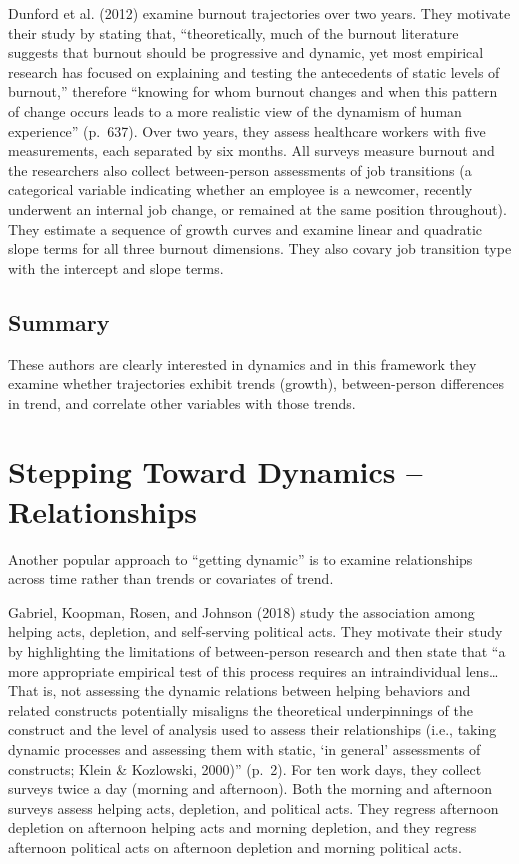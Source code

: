 \documentclass[english,,man]{apa6}
\theoremstyle{definition}
\theoremstyle{definition}
\theoremstyle{definition}
\theoremstyle{remark}
\begin{document}
Dunford et al. (2012) examine burnout trajectories over two years. They
motivate their study by stating that, \enquote{theoretically, much of
the burnout literature suggests that burnout should be progressive and
dynamic, yet most empirical research has focused on explaining and
testing the antecedents of static levels of burnout,} therefore
\enquote{knowing for whom burnout changes and when this pattern of
change occurs leads to a more realistic view of the dynamism of human
experience} (p.~637). Over two years, they assess healthcare workers
with five measurements, each separated by six months. All surveys
measure burnout and the researchers also collect between-person
assessments of job transitions (a categorical variable indicating
whether an employee is a newcomer, recently underwent an internal job
change, or remained at the same position throughout). They estimate a
sequence of growth curves and examine linear and quadratic slope terms
for all three burnout dimensions. They also covary job transition type
with the intercept and slope terms.

\hypertarget{summary}{%
\subsection{Summary}\label{summary}}

These authors are clearly interested in dynamics and in this framework
they examine whether trajectories exhibit trends (growth),
between-person differences in trend, and correlate other variables with
those trends.

\hypertarget{stepping-toward-dynamics-relationships}{%
\section{Stepping Toward Dynamics --
Relationships}\label{stepping-toward-dynamics-relationships}}

Another popular approach to \enquote{getting dynamic} is to examine
relationships across time rather than trends or covariates of trend.

Gabriel, Koopman, Rosen, and Johnson (2018) study the association among
helping acts, depletion, and self-serving political acts. They motivate
their study by highlighting the limitations of between-person research
and then state that \enquote{a more appropriate empirical test of this
process requires an intraindividual lens\ldots{} That is, not assessing
the dynamic relations between helping behaviors and related constructs
potentially misaligns the theoretical underpinnings of the construct and
the level of analysis used to assess their relationships (i.e., taking
dynamic processes and assessing them with static, \enquote{in general}
assessments of constructs; Klein \& Kozlowski, 2000)} (p.~2). For ten
work days, they collect surveys twice a day (morning and afternoon).
Both the morning and afternoon surveys assess helping acts, depletion,
and political acts. They regress afternoon depletion on afternoon
helping acts and morning depletion, and they regress afternoon political
acts on afternoon depletion and morning political acts.
\end{document}
